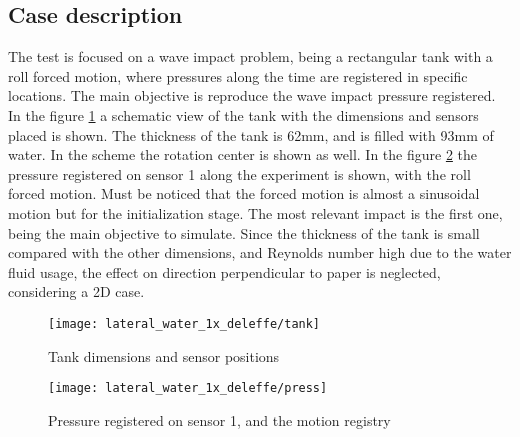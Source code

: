 \subsection{Case description}
\label{sss:example:lateral_water_1x_deleffe:caseDescription}
%
The test is focused on a wave impact problem, being a rectangular tank with a roll forced motion, where pressures
along the time are registered in specific locations. The main objective is reproduce the wave impact pressure
registered.\rc
%
In the figure \ref{fig:examples:lateral_water_1x_deleffe_scheme:scheme} a schematic view of the tank with the
dimensions and sensors placed is shown. The thickness of the tank is 62mm, and is filled with 93mm of water.
In the scheme the rotation center is shown as well.\rc
%
In the figure \ref{fig:examples:lateral_water_1x_deleffe_scheme:press} the pressure registered on sensor 1
along the experiment is shown, with the roll forced motion. Must be noticed that the forced motion is almost a
sinusoidal motion but for the initialization stage. The most relevant impact is the first one, being the main
objective to simulate.\rc
%
Since the thickness of the tank is small compared with the other dimensions, and Reynolds number high due to the
water fluid usage, the effect on direction perpendicular to paper is neglected, considering a 2D case.
%
\begin{figure}[h!]
  \centering
  \texttt{[image: lateral\_water\_1x\_deleffe/tank]}
  \caption{Tank dimensions and sensor positions}
  \label{fig:examples:lateral_water_1x_deleffe_scheme:scheme}
\end{figure}
%
\begin{figure}[h!]
  \centering
  \texttt{[image: lateral\_water\_1x\_deleffe/press]}
  \caption{Pressure registered on sensor 1, and the motion registry}
  \label{fig:examples:lateral_water_1x_deleffe_scheme:press}
\end{figure}
%
